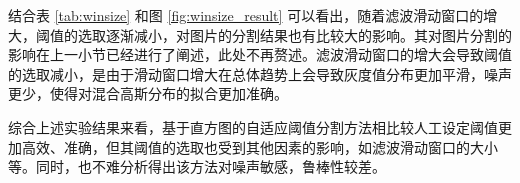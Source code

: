 结合表 \ref{tab:winsize} 和图 \ref{fig:winsize_result} 可以看出，随着滤波滑动窗口的增大，阈值的选取逐渐减小，对图片的分割结果也有比较大的影响。其对图片分割的影响在上一小节已经进行了阐述，此处不再赘述。滤波滑动窗口的增大会导致阈值的选取减小，是由于滑动窗口增大在总体趋势上会导致灰度值分布更加平滑，噪声更少，使得对混合高斯分布的拟合更加准确。

综合上述实验结果来看，基于直方图的自适应阈值分割方法相比较人工设定阈值更加高效、准确，但其阈值的选取也受到其他因素的影响，如滤波滑动窗口的大小等。同时，也不难分析得出该方法对噪声敏感，鲁棒性较差。
